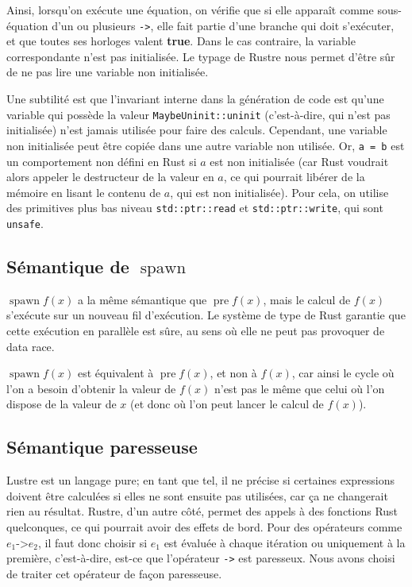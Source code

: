 \documentclass{scrartcl}
\DeclareMathOperator{\mspawn}{spawn}
\DeclareMathOperator{\mpre}{pre}
\newcommand{\keyword}[1]{{\textcolor{green!50!black}{\textbf{#1}}}}
\newcommand{\true}{\keyword{true}}
\begin{document}
Ainsi, lorsqu'on exécute une équation, on vérifie que si elle apparaît comme sous-équation d'un
ou plusieurs \texttt{->}, elle fait partie d'une branche qui doit s'exécuter, et que toutes ses
horloges valent \true. Dans le cas contraire, la variable correspondante n'est pas
initialisée. Le typage de Rustre nous permet d'être sûr de ne pas lire une variable non
initialisée.

Une subtilité est que l'invariant interne dans la génération de code est qu'une variable qui
possède la valeur \texttt{MaybeUninit::uninit} (c'est-à-dire, qui n'est pas initialisée) n'est
jamais utilisée pour faire des calculs. Cependant, une variable non initialisée peut être copiée
dans une autre variable non utilisée. Or, \texttt{a = b} est un comportement non défini en Rust
si \(a\) est non initialisée (car Rust voudrait alors appeler le destructeur de la valeur en
\(a\), ce qui pourrait libérer de la mémoire en lisant le contenu de \(a\), qui est non
initialisée). Pour cela, on utilise des primitives plus bas niveau \texttt{std::ptr::read} et
\texttt{std::ptr::write}, qui sont \texttt{unsafe}.

\subsection{Sémantique de \(\mspawn\)}
\(\mspawn f(x)\) a la même sémantique que \(\mpre f(x)\), mais le calcul de
\(f(x)\) s'exécute sur un nouveau fil d'exécution. Le système de type de Rust garantie que cette
exécution en parallèle est sûre, au sens où elle ne peut pas provoquer de data race.

\(\mspawn f(x)\) est équivalent à \(\mpre f(x)\), et non à \(f(x)\), car ainsi le cycle où l'on a
besoin d'obtenir la valeur de \(f(x)\) n'est pas le même que celui où l'on dispose de la valeur
de \(x\) (et donc où l'on peut lancer le calcul de \(f(x)\)).

\subsection{Sémantique paresseuse}
Lustre est un langage pure; en tant que tel, il ne précise si certaines expressions doivent être
calculées si elles ne sont ensuite pas utilisées, car ça ne changerait rien au résultat. Rustre,
d'un autre côté, permet des appels à des fonctions Rust quelconques, ce qui pourrait avoir des
effets de bord. Pour des opérateurs comme \(e_1 \texttt{->} e_2\), il faut donc choisir si
\(e_1\) est évaluée à chaque itération ou uniquement à la première, c'est-à-dire, est-ce que
l'opérateur \texttt{->} est paresseux. Nous avons choisi de traiter cet opérateur de façon
paresseuse.
\end{document}
